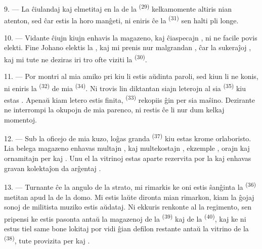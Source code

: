 9. --- La ĉiulandaj  kaj  elmetitaj en la
 de la  \textsuperscript{(29)} kelkamomente
altiris nian atenton, sed ĉar estis la horo manĝeti, ni eniris ĉe la
 \textsuperscript{(31)} sen halti pli longe.

10. --- Vidante ĉiujn  kiujn enhavis la magazeno,
 kaj ĉiaspecajn , ni
ne facile povis elekti. Fine Johano elektis la , kaj mi
prenis nur malgrandan , ĉar la sukeraĵoj , kaj mi tute ne deziras iri tro ofte viziti la 
\textsuperscript{(30)}.

\VUsaut{3.0mm}

11. --- Por montri al mia amiko  pri kiu li estis aŭdinta
paroli, sed kiun li ne konis, ni eniris la 
\textsuperscript{(32)} de mia  \textsuperscript{(34)}. Ni trovis
lin diktantan siajn leterojn al sia  \textsuperscript{(35)}
kiu estas . Apenaŭ kiam letero estis finita,
 \textsuperscript{(33)} rekopiis ĝin per sia maŝino.
Dezirante ne interrompi la okupojn de mia parenco, ni restis ĉe li nur dum
kelkaj momentoj.

12. --- Sub la oficejo de mia kuzo, loĝas granda 
\textsuperscript{(37)} kiu estas krome orlaboristo. Lia belega magazeno enhavas
multajn , 
kaj multekostajn , ekzemple , orajn
 kaj  ornamitajn per
 kaj . Unu el la vitrinoj estas aparte
rezervita por la  kaj enhavas gravan kolektaĵon da arĝentaj
.

13. --- Turnante ĉe la angulo de la strato, mi rimarkis ke oni estis ŝanĝinta
la  \textsuperscript{(36)} metitan apud la  de la
domo. Mi estis laŭte dironta mian rimarkon, kiam la ĝojaj sonoj de 
militista muziko estis aŭdataj. Ni ekkuris renkonte al la regimento, sen
pripensi ke  estis pasonta antaŭ la magazenoj de la
 \textsuperscript{(39)} kaj de la 
\textsuperscript{(40)}, kaj ke ni estus tiel same bone lokitaj por vidi ĝian
defilon restante antaŭ la vitrino de la 
\textsuperscript{(38)}, tute provizita per 
kaj .

